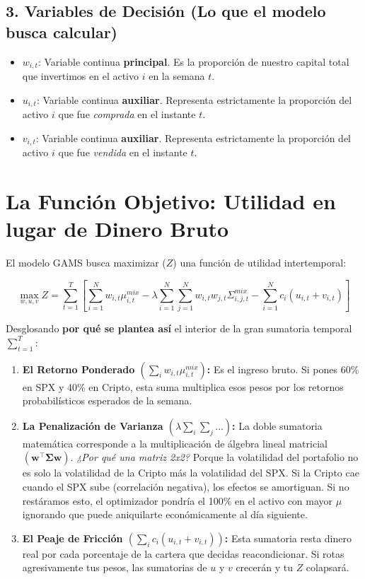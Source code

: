 \documentclass[11pt,a4paper]{article}
\begin{document}
\subsection{3. Variables de Decisión (Lo que el modelo busca calcular)}
\begin{itemize}
    \item $w_{i,t}$: Variable continua \textbf{principal}. Es la proporción de nuestro capital total que invertimos en el activo $i$ en la semana $t$.
    \item $u_{i,t}$: Variable continua \textbf{auxiliar}. Representa estrictamente la proporción del activo $i$ que fue \textit{comprada} en el instante $t$.
    \item $v_{i,t}$: Variable continua \textbf{auxiliar}. Representa estrictamente la proporción del activo $i$ que fue \textit{vendida} en el instante $t$.
\end{itemize}

\section{La Función Objetivo: Utilidad en lugar de Dinero Bruto}
El modelo GAMS busca maximizar ($Z$) una función de utilidad intertemporal:

\begin{equation}
\max_{w,u,v} Z = \sum_{t=1}^T \left[ \sum_{i=1}^N w_{i,t}\mu^{mix}_{i,t} - \lambda \sum_{i=1}^N \sum_{j=1}^N w_{i,t} w_{j,t} \Sigma^{mix}_{i,j,t} - \sum_{i=1}^N c_i (u_{i,t} + v_{i,t}) \right]
\end{equation}

Desglosando \textbf{por qué se plantea así} el interior de la gran sumatoria temporal $\sum_{t=1}^T$:
\begin{enumerate}
    \item \textbf{El Retorno Ponderado $\left(\sum_{i} w_{i,t}\mu^{mix}_{i,t}\right)$:} Es el ingreso bruto. Si pones 60\% en SPX y 40\% en Cripto, esta suma multiplica esos pesos por los retornos probabilísticos esperados de la semana.
    \item \textbf{La Penalización de Varianza $\left(\lambda \sum_{i} \sum_{j} \dots \right)$:} La doble sumatoria matemática corresponde a la multiplicación de álgebra lineal matricial $(\mathbf{w}^\top \boldsymbol{\Sigma} \mathbf{w})$. \textit{¿Por qué una matriz 2x2?} Porque la volatilidad del portafolio no es solo la volatilidad de la Cripto más la volatilidad del SPX. Si la Cripto cae cuando el SPX sube (correlación negativa), los efectos se amortiguan. Si no restáramos esto, el optimizador pondría el 100\% en el activo con mayor $\mu$ ignorando que puede aniquilarte económicamente al día siguiente. 
    \item \textbf{El Peaje de Fricción $\left(\sum_i c_i (u_{i,t} + v_{i,t})\right)$:} Esta sumatoria resta dinero real por cada porcentaje de la cartera que decidas reacondicionar. Si rotas agresivamente tus pesos, las sumatorias de $u$ y $v$ crecerán y tu $Z$ colapsará.
\end{enumerate}
\end{document}
